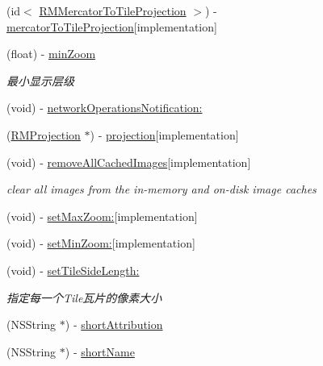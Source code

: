 \begin{DoxyCompactItemize}
(id$<$ \hyperlink{protocol_r_m_mercator_to_tile_projection-p}{R\-M\-Mercator\-To\-Tile\-Projection} $>$) -\/ \hyperlink{interface_r_m_s_m_tile_source_af9be659eb21627ba375d9ebcd4805222}{mercator\-To\-Tile\-Projection}{\ttfamily  \mbox{[}implementation\mbox{]}}
\item 
(float) -\/ \hyperlink{interface_r_m_s_m_tile_source_a09b17c06c12d242aac45253525658efa}{min\-Zoom}
\begin{DoxyCompactList}\small\item\em 最小显示层级 \end{DoxyCompactList}\item 
(void) -\/ \hyperlink{interface_r_m_s_m_tile_source_adf17fe0eafaedfabf19671b19c428875}{network\-Operations\-Notification\-:}
\item 
(\hyperlink{interface_r_m_projection}{R\-M\-Projection} $\ast$) -\/ \hyperlink{interface_r_m_s_m_tile_source_a2868f4f1ded53b77b6f59a559a54e197}{projection}{\ttfamily  \mbox{[}implementation\mbox{]}}
\item 
(void) -\/ \hyperlink{interface_r_m_s_m_tile_source_a104de0dc4568424913ec105ac4065ada}{remove\-All\-Cached\-Images}{\ttfamily  \mbox{[}implementation\mbox{]}}
\begin{DoxyCompactList}\small\item\em clear all images from the in-\/memory and on-\/disk image caches \end{DoxyCompactList}\item 
(void) -\/ \hyperlink{interface_r_m_s_m_tile_source_a60033e5f9c33fd56bf600cf2fc036cd7}{set\-Max\-Zoom\-:}{\ttfamily  \mbox{[}implementation\mbox{]}}
\item 
(void) -\/ \hyperlink{interface_r_m_s_m_tile_source_a2d289c57b5645b533b6672f4e8263142}{set\-Min\-Zoom\-:}{\ttfamily  \mbox{[}implementation\mbox{]}}
\item 
(void) -\/ \hyperlink{interface_r_m_s_m_tile_source_af17e1b4f11032aaf94ea25734d4af501}{set\-Tile\-Side\-Length\-:}
\begin{DoxyCompactList}\small\item\em 指定每一个\-Tile瓦片的像素大小 \end{DoxyCompactList}\item 
(N\-S\-String $\ast$) -\/ \hyperlink{interface_r_m_s_m_tile_source_a2e1e181b771caa1b172516e121879794}{short\-Attribution}
\item 
(N\-S\-String $\ast$) -\/ \hyperlink{interface_r_m_s_m_tile_source_a87237e853595be20d546e2ddd5da691b}{short\-Name}
\item 

\end{DoxyCompactItemize}
